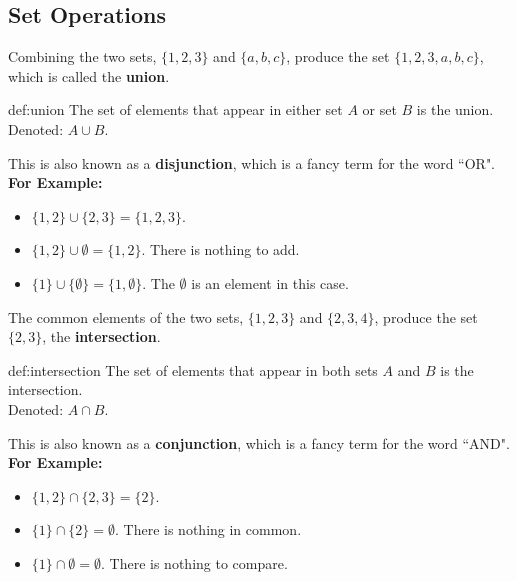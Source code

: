 \subsection{Set Operations}


Combining the two sets, $\{1,2,3\}$ and $\{a,b,c\}$, produce the set $\{1,2,3,a,b,c\}$, which
is called the \textbf{union}.\\

\begin{Def}[Union]{def:union}
    The set of elements that appear in either set $A$ or set $B$ is the union.\\
    Denoted: $A \cup B$.
\end{Def}

\noindent
This is also known as a \textbf{disjunction}, which is a fancy term for the word ``OR".\\

\noindent
\textbf{For Example:}
\begin{itemize}
    \item $\{1, 2\} \cup \{2, 3\} = \{1, 2, 3\}$.
    \item $\{1,2\} \cup \emptyset = \{1, 2\}$. There is nothing to add.
    \item $\{1\} \cup \{\emptyset\} = \{1, \emptyset\}$. The $\emptyset$ is an element in this case.
\end{itemize}

\noindent
The common elements of the two sets, $\{1,2,3\}$ and $\{2,3,4\}$, produce the set $\{2,3\}$,
the \textbf{intersection}.\\

\begin{Def}[Intersection]{def:intersection}
    The set of elements that appear in both sets $A$ and $B$ is the intersection.\\
    Denoted: $A \cap B$.
\end{Def}

\noindent
This is also known as a \textbf{conjunction}, which is a fancy term for the word ``AND".\\

\noindent
\textbf{For Example:}
\begin{itemize}
    \item $\{1, 2\} \cap \{2, 3\} = \{2\}$.
    \item $\{1\} \cap \{2\} = \emptyset$. There is nothing in common.
    \item $\{1\} \cap \emptyset = \emptyset$. There is nothing to compare.
\end{itemize}

